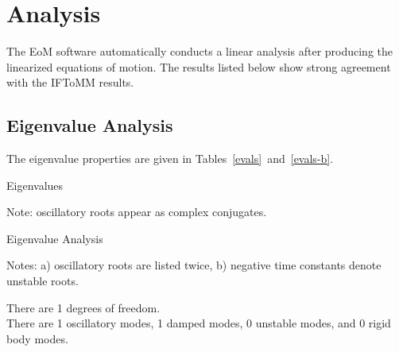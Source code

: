 \chapter{Analysis}
The EoM software automatically conducts a linear analysis after producing the linearized equations of motion.  The results listed below show strong agreement with the IFToMM results.
\section{Eigenvalue Analysis}
The eigenvalue properties are given in Tables~\ref{evals}~and~\ref{evals-b}.

\begin{table}[ht]
\begin{center}
\begin{threeparttable}
\begin{footnotesize}
\caption{Eigenvalues}
\label{evals}
\begin{tablenotes}
\item Note: oscillatory roots appear as complex conjugates.
\end{tablenotes}
\end{footnotesize}
\end{threeparttable}
\end{center}
\end{table}
\begin{table}[ht]
\begin{center}
\begin{threeparttable}
\begin{footnotesize}
\caption{Eigenvalue Analysis}
\label{evals-b}
\begin{tablenotes}
\item Notes: a) oscillatory roots are listed twice, b) negative time constants denote unstable roots.
\end{tablenotes}
\end{footnotesize}
\end{threeparttable}
\end{center}
\end{table}
There are 1 degrees of freedom.\\

There are 1 oscillatory modes, 1 damped modes, 0 unstable modes, and 0 rigid body modes.
\pagebreak
